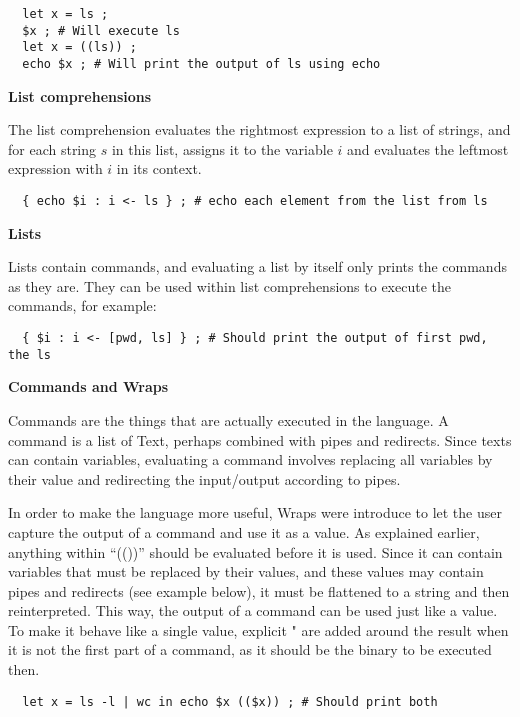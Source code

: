 \documentclass[11pt,a4paper]{article}
\begin{document}
\begin{verbatim}
  let x = ls ;
  $x ; # Will execute ls
  let x = ((ls)) ;
  echo $x ; # Will print the output of ls using echo
\end{verbatim}

\textbf{List comprehensions}

The list comprehension evaluates the rightmost expression to a list of strings,
and for each string $s$ in this list, assigns it to the variable $i$ and
evaluates the leftmost expression with $i$ in its context.

\begin{verbatim}
  { echo $i : i <- ls } ; # echo each element from the list from ls
\end{verbatim}

\textbf{Lists}

Lists contain commands, and evaluating a list by itself only prints the
commands as they are. They can be used within list comprehensions to execute
the commands, for example:

\begin{verbatim}
  { $i : i <- [pwd, ls] } ; # Should print the output of first pwd, the ls
\end{verbatim}

\textbf{Commands and Wraps}

Commands are the things that are actually executed in the language. A command
is a list of Text, perhaps combined with pipes and redirects. Since texts can
contain variables, evaluating a command involves replacing all variables by
their value and redirecting the input/output according to pipes.

In order to make the language more useful, Wraps were introduce to let the user
capture the output of a command and use it as a value. As explained earlier,
anything within ``(())'' should be evaluated before it is used. Since it can
contain variables that must be replaced by their values, and these values may
contain pipes and redirects (see example below), it must be flattened to a
string and then reinterpreted. This way, the output of a command can be used
just like a value. To make it behave like a single value, explicit " are added
around the result when it is not the first part of a command, as it should be
the binary to be executed then.

\begin{verbatim}
  let x = ls -l | wc in echo $x (($x)) ; # Should print both
\end{verbatim}
\end{document}

